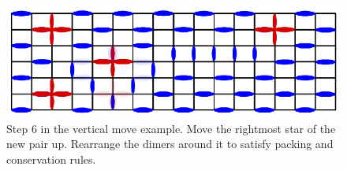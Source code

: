 \documentclass[aps,floatfix,11pt]{revtex4-1}
\begin{document}
\begin{figure}[h]
    \centering
    \includegraphics[width=8.5 cm]{ex_vert_mv_6}
    \caption{Step 6 in the vertical move example. Move the rightmost star of the new pair up.
    Rearrange the dimers around it to satisfy packing and conservation rules.\label{fig:ex_vert_mv_6}}
\end{figure}


% 
\end{document}
